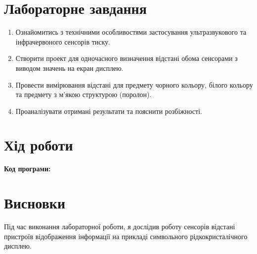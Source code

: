 \documentclass[oneside,14pt]{extarticle}
\begin{document}
\begin{normalsize}
    \section*{\hfil Лабораторне завдання\hfil}
	\begin{enumerate}
		\item Ознайомитись з технічними особливостями застосування
		ультразвукового та інфрачервоного сенсорів тиску.
		\item Створити проект для одночасного визначення відстані обома сенсорами з
		виводом значень на екран дисплею.
		\item Провести вимірювання відстані для предмету чорного кольору, білого
		кольору та предмету з м’якою структурою (поролон).
		\item Проаналізувати отримані результати та пояснити розбіжності.
	\end{enumerate}

	\section*{\hfil Хід роботи\hfil}
	
	\textbf{Код програми:}
	
	
	
	
	\section*{\hfil Висновки\hfil}
	Під час виконання лабораторної роботи, я дослідив роботу сенсорів відстані пристроїв
	відображення інформації на прикладі символьного рідкокристалічного
	дисплею.
		    
\end{normalsize}
\end{document}
